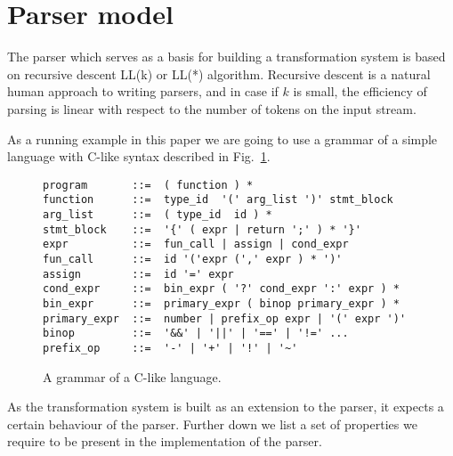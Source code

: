 \section{\label{sec:parser}Parser model}

The parser which serves as a basis for building a transformation 
system is 
based on recursive descent LL(k) or LL(*) algorithm.  Recursive
descent is a natural human approach to writing parsers, and in
case if $k$ is small, the efficiency of parsing is linear with
respect to the number of tokens on the input stream. 

As a running example in this paper we are going to use a
grammar of a simple language with C-like syntax described in
Fig.~\ref{fig:grammar}.

\begin{figure}[h!]
\centering
\begin{verbatim}
program       ::=  ( function ) * 
function      ::=  type_id  '(' arg_list ')' stmt_block 
arg_list      ::=  ( type_id  id ) * 
stmt_block    ::=  '{' ( expr | return ';' ) * '}' 
expr          ::=  fun_call | assign | cond_expr 
fun_call      ::=  id '('expr (',' expr ) * ')' 
assign        ::=  id '=' expr 
cond_expr     ::=  bin_expr ( '?' cond_expr ':' expr ) * 
bin_expr      ::=  primary_expr ( binop primary_expr ) *
primary_expr  ::=  number | prefix_op expr | '(' expr ')' 
binop         ::=  '&&' | '||' | '==' | '!=' ... 
prefix_op     ::=  '-' | '+' | '!' | '~' 
\end{verbatim}
\caption{\label{fig:grammar}A grammar of a C-like language.}
\end{figure}

\noindent
As the transformation system is built as an extension to the parser, 
it expects a certain behaviour of the parser.  Further down
we list a set of properties we require to be present in the 
implementation of the parser.

